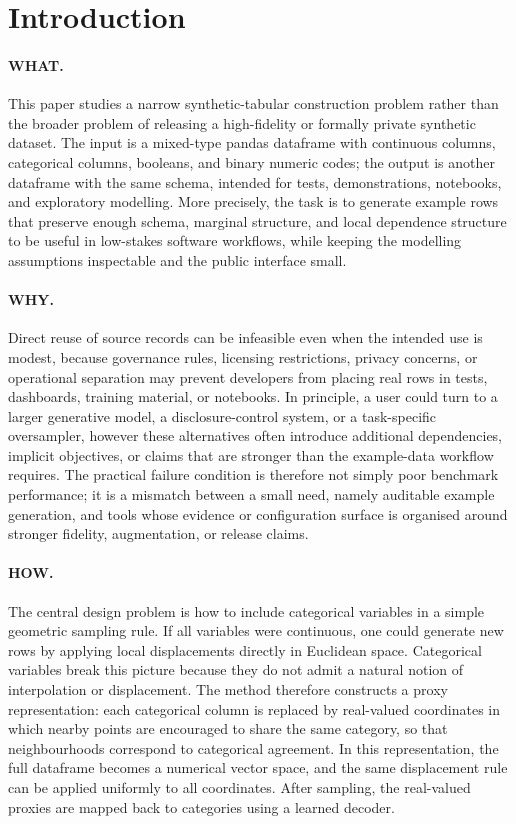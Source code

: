\section{Introduction}

\paragraph{WHAT.}
This paper studies a narrow synthetic-tabular construction problem rather than
the broader problem of releasing a high-fidelity or formally private synthetic
dataset. The input is a mixed-type pandas dataframe with continuous columns,
categorical columns, booleans, and binary numeric codes; the output is another
dataframe with the same schema, intended for tests, demonstrations, notebooks,
and exploratory modelling. More precisely, the task is to generate example rows
that preserve enough schema, marginal structure, and local dependence structure
to be useful in low-stakes software workflows, while keeping the modelling
assumptions inspectable and the public interface small.

\paragraph{WHY.}
Direct reuse of source records can be infeasible even when the intended use is
modest, because governance rules, licensing restrictions, privacy concerns, or
operational separation may prevent developers from placing real rows in tests,
dashboards, training material, or notebooks. In principle, a user could turn to
a larger generative model, a disclosure-control system, or a task-specific
oversampler, however these alternatives often introduce additional dependencies,
implicit objectives, or claims that are stronger than the example-data workflow
requires. The practical failure condition is therefore not simply poor benchmark
performance; it is a mismatch between a small need, namely auditable example
generation, and tools whose evidence or configuration surface is organised
around stronger fidelity, augmentation, or release claims.

\paragraph{HOW.}
The central design problem is how to include categorical variables in a simple
geometric sampling rule. If all variables were continuous, one could generate
new rows by applying local displacements directly in Euclidean space.
Categorical variables break this picture because they do not admit a natural
notion of interpolation or displacement. The method therefore constructs a
proxy representation: each categorical column is replaced by real-valued
coordinates in which nearby points are encouraged to share the same category,
so that neighbourhoods correspond to categorical agreement.
In this representation, the full dataframe becomes a numerical vector space,
and the same displacement rule can be applied uniformly to all coordinates.
After sampling, the real-valued proxies are mapped back to categories using a
learned decoder.

